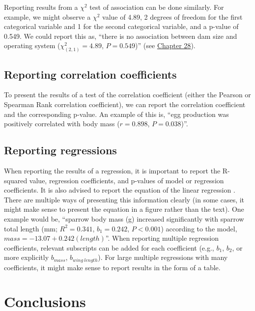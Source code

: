 \documentclass[
]{scrbook}
\begin{document}
Reporting results from a \(\chi^{2}\) test of association can be done similarly.
For example, we might observe a \(\chi^{2}\) value of 4.89, 2 degrees of freedom for the first categorical variable and 1 for the second categorical variable, and a p-value of 0.549.
We could report this as, ``there is no association between dam size and operating system (\(\chi^{2}_{(2, 1)} = 4.89\), \(P = 0.549\))'' (see \protect\hyperlink{Chapter_28}{Chapter 28}).

\hypertarget{reporting-correlation-coefficients}{%
\subsection{Reporting correlation coefficients}\label{reporting-correlation-coefficients}}

To present the results of a test of the correlation coefficient (either the Pearson or Spearman Rank correlation coefficient), we can report the correlation coefficient and the corresponding p-value.
An example of this is, ``egg production was positively correlated with body mass (\(r = 0.898\), \(P = 0.038\))''.

\hypertarget{reporting-regressions}{%
\subsection{Reporting regressions}\label{reporting-regressions}}

When reporting the results of a regression, it is important to report the R-squared value, regression coefficients, and p-values of model or regression coefficients.
It is also advised to report the equation of the linear regression \citep{Lang1997}.
There are multiple ways of presenting this information clearly (in some cases, it might make sense to present the equation in a figure rather than the text).
One example would be, ``sparrow body mass (g) increased significantly with sparrow total length (mm; \(R^{2} = 0.341\), \(b_{1} = 0.242\), \(P < 0.001\)) according to the model, \(mass = -13.07 + 0.242(length)\)''.
When reporting multiple regression coefficients, relevant subscripts can be added for each coefficient (e.g., \(b_{1}\), \(b_{2}\), or more explicitly \(b_{mass}\), \(b_{wing\:length}\)).
For large multiple regressions with many coefficients, it might make sense to report results in the form of a table.

\hypertarget{conclusions}{%
\section{Conclusions}\label{conclusions}}
\end{document}

